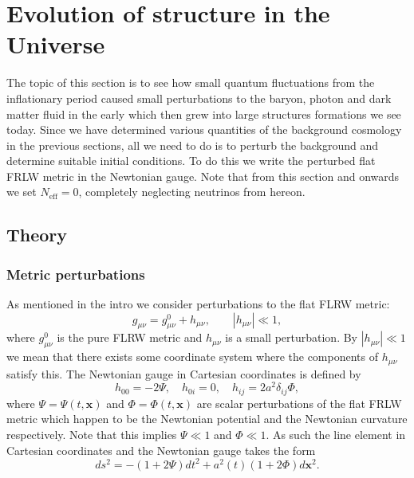 \documentclass[%
reprint,
 amsmath,amssymb,
 aps,
]{revtex4-2}
\begin{document}
\section{Evolution of structure in the Universe}
\label{sec:3}
The topic of this section is to see how small quantum fluctuations from the inflationary period caused small perturbations to the baryon, photon and dark matter fluid in the early which then grew into large structures formations we see today. Since we have determined various quantities of the background cosmology in the previous sections, all we need to do is to perturb the background and determine suitable initial conditions. To do this we write the perturbed flat FRLW metric in the Newtonian gauge. Note that from this section and onwards we set $N_\text{eff}=0$, completely neglecting neutrinos from hereon.

\subsection{Theory}
\subsubsection{Metric perturbations}
As mentioned in the intro we consider perturbations to the flat FLRW metric:
\[g_{\mu\nu}=g^{0}_{\mu\nu}+h_{\mu\nu},\quad\quad|h_{\mu\nu}|\ll1,\]
where $g^0_{\mu\nu}$ is the pure FLRW metric and $h_{\mu\nu}$ is a small perturbation. By $|h_{\mu\nu}|\ll1$ we mean that there exists some coordinate system where the components of $h_{\mu\nu}$ satisfy this. The Newtonian gauge in Cartesian coordinates is defined by
\[h_{00}=-2\Psi,\quad h_{0i}=0,\quad h_{ij}=2a^2\delta_{ij}\Phi,\]
where $\Psi=\Psi(t,\textbf{x})$ and $\Phi=\Phi(t,\textbf{x})$ are scalar perturbations of the flat FRLW metric which happen to be the Newtonian potential and the Newtonian curvature respectively. Note that this implies $\Psi\ll1$ and $\Phi\ll 1$. As such the line element in Cartesian coordinates and the Newtonian gauge takes the form
\[ds^2=-(1+2\Psi)dt^2+a^2(t)(1+2\Phi)d\textbf{x}^2.\]
\end{document}
